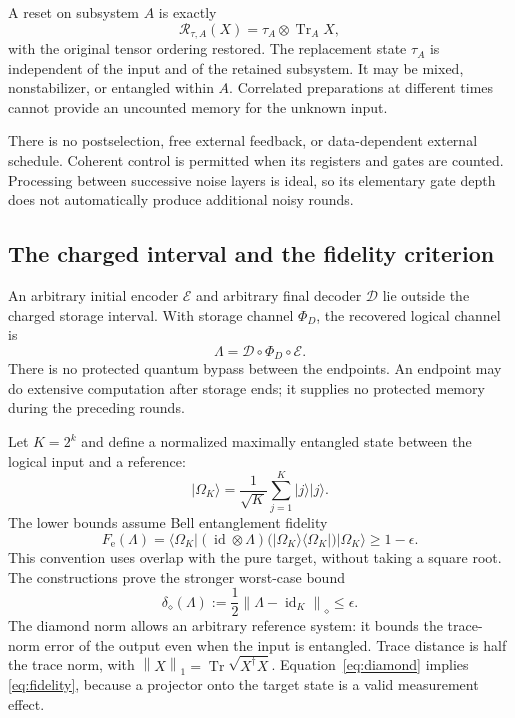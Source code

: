 \documentclass[11pt,a4paper]{article}
\numberwithin{equation}{section}
\theoremstyle{remark}\newtheorem*{remark}{Interpretation}
\newcommand{\id}{\operatorname{id}}
\newcommand{\Tr}{\operatorname{Tr}}
\newcommand{\R}{\mathcal R}
\newcommand{\eps}{\epsilon}
\newcommand{\Fe}{F_{\mathrm e}}
\newcommand{\dd}{\delta_{\diamond}}
\newcommand{\ket}[1]{\lvert#1\rangle}
\newcommand{\bra}[1]{\langle#1\rvert}
\newcommand{\norm}[1]{\left\lVert#1\right\rVert}
\begin{document}
A reset on subsystem $A$ is exactly
\begin{equation}
\R_{\tau,A}(X)=\tau_A\otimes\Tr_A X,
\label{eq:reset}
\end{equation}
with the original tensor ordering restored. The replacement state $\tau_A$ is independent of the input and of the retained subsystem. It may be mixed, nonstabilizer, or entangled within $A$. Correlated preparations at different times cannot provide an uncounted memory for the unknown input.

There is no postselection, free external feedback, or data-dependent external schedule. Coherent control is permitted when its registers and gates are counted. Processing between successive noise layers is ideal, so its elementary gate depth does not automatically produce additional noisy rounds.

\subsection{The charged interval and the fidelity criterion}
An arbitrary initial encoder $\mathcal E$ and arbitrary final decoder $\mathcal D$ lie outside the charged storage interval. With storage channel $\Phi_D$, the recovered logical channel is
\begin{equation}
\Lambda=\mathcal D\circ\Phi_D\circ\mathcal E.
\end{equation}
There is no protected quantum bypass between the endpoints. An endpoint may do extensive computation after storage ends; it supplies no protected memory during the preceding rounds.

Let $K=2^k$ and define a normalized maximally entangled state between the logical input and a reference:
\begin{equation}
\ket{\Omega_K}=\frac1{\sqrt K}\sum_{j=1}^K\ket j\ket j.
\end{equation}
The lower bounds assume Bell entanglement fidelity
\begin{equation}
\Fe(\Lambda)=\bra{\Omega_K}(\id\otimes\Lambda)
\bigl(\ket{\Omega_K}\bra{\Omega_K}\bigr)\ket{\Omega_K}
\ge1-\eps.
\label{eq:fidelity}
\end{equation}
This convention uses overlap with the pure target, without taking a square root. The constructions prove the stronger worst-case bound
\begin{equation}
\dd(\Lambda):=\frac12\norm{\Lambda-\id_K}_\diamond\le\eps.
\label{eq:diamond}
\end{equation}
The diamond norm allows an arbitrary reference system: it bounds the trace-norm error of the output even when the input is entangled. Trace distance is half the trace norm, with $\norm X_1=\Tr\sqrt{X^\dagger X}$. Equation~\eqref{eq:diamond} implies \eqref{eq:fidelity}, because a projector onto the target state is a valid measurement effect.
\end{document}
